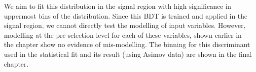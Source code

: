 We aim to fit this distribution in the signal region with high significance in uppermost bins of the distribution. Since this BDT is trained and applied in the signal region, we cannot directly test the modelling of input variables. However, modelling at the pre-selection level for each of these variables, shown earlier in the chapter show no evidence of mis-modelling. The binning for this discriminant used in the statistical fit and its result (using Asimov data) are shown in the final chapter. 
